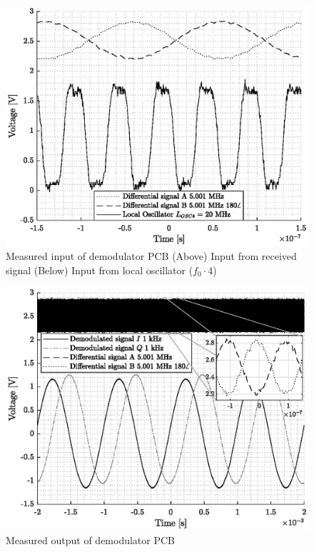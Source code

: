 \begin{figure}[htbp]
	\centering
	\includegraphics[width=.8\textwidth]{Figures/4_demod_pcb_in.eps}
	\caption[Measured input of demodulator PCB]{Measured input of demodulator PCB (Above) Input from received signal (Below) Input from local oscillator ($f_{0}\cdot4$)}
	\label{fig:4_demod_in}
\end{figure}
\begin{figure}[htbp]
	\centering
	\includegraphics[width=.8\textwidth]{Figures/4_demod_pcb_out.eps}
	\caption[Measured output of demodulator PCB]{Measured output of demodulator PCB}
	\label{fig:4_demod_out}
\end{figure}

